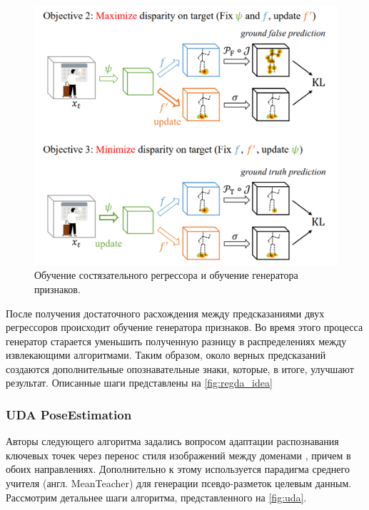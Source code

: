 \begin{figure}[h]
	\centering
	\includegraphics[width=.8\textwidth]{./images/review/regda_idea}
	\caption{Обучение состязательного регрессора и обучение генератора признаков.\cite{regda}}
	\label{fig:regda_idea}
\end{figure}

После получения достаточного расхождения между предсказаниями двух регрессоров происходит обучение генератора признаков. Во время этого процесса генератор старается уменьшить полученную разницу в распределениях между извлекающими алгоритмами. Таким образом, около верных предсказаний создаются дополнительные опознавательные знаки, которые, в итоге, улучшают результат. Описанные шаги представлены на \autoref{fig:regda_idea}


\subsubsection*{UDA PoseEstimation}

Авторы следующего алгоритма задались вопросом адаптации распознавания ключевых точек через перенос стиля изображений между доменами \cite{uda}, причем в обоих направлениях. Дополнительно к этому используется парадигма среднего учителя (англ. MeanTeacher) для генерации псевдо-разметок целевым данным. Рассмотрим детальнее шаги алгоритма, представленного на \autoref{fig:uda}.

